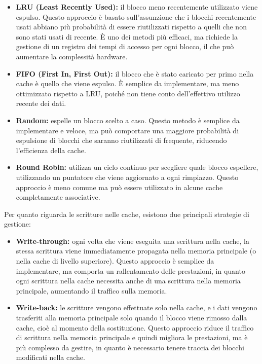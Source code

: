 \begin{itemize}
  \item \textbf{LRU (Least Recently Used):} il blocco meno recentemente utilizzato viene espulso. Questo approccio è basato sull’assunzione che i blocchi recentemente usati abbiano più probabilità di essere riutilizzati rispetto a quelli che non sono stati usati di recente. È uno dei metodi più efficaci, ma richiede la gestione di un registro dei tempi di accesso per ogni blocco, il che può aumentare la complessità hardware.
  
  \item \textbf{FIFO (First In, First Out):} il blocco che è stato caricato per primo nella cache è quello che viene espulso. È semplice da implementare, ma meno ottimizzato rispetto a LRU, poiché non tiene conto dell'effettivo utilizzo recente dei dati.
  
  \item \textbf{Random:} espelle un blocco scelto a caso. Questo metodo è semplice da implementare e veloce, ma può comportare una maggiore probabilità di espulsione di blocchi che saranno riutilizzati di frequente, riducendo l'efficienza della cache.
  
  \item \textbf{Round Robin:} utilizza un ciclo continuo per scegliere quale blocco espellere, utilizzando un puntatore che viene aggiornato a ogni rimpiazzo. Questo approccio è meno comune ma può essere utilizzato in alcune cache completamente associative.
\end{itemize}

Per quanto riguarda le scritture nelle cache, esistono due principali strategie di gestione:

\begin{itemize}
  \item \textbf{Write-through:} ogni volta che viene eseguita una scrittura nella cache, la stessa scrittura viene immediatamente propagata nella memoria principale (o nella cache di livello superiore). Questo approccio è semplice da implementare, ma comporta un rallentamento delle prestazioni, in quanto ogni scrittura nella cache necessita anche di una scrittura nella memoria principale, aumentando il traffico sulla memoria.
  
  \item \textbf{Write-back:} le scritture vengono effettuate solo nella cache, e i dati vengono trasferiti alla memoria principale solo quando il blocco viene rimosso dalla cache, cioè al momento della sostituzione. Questo approccio riduce il traffico di scrittura nella memoria principale e quindi migliora le prestazioni, ma è più complesso da gestire, in quanto è necessario tenere traccia dei blocchi modificati nella cache.
\end{itemize}

